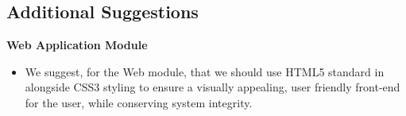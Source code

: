 \documentclass[12pt]{article}
\begin{document}
                   \subsection{Additional Suggestions}
                   \textbf{Web Application Module}
                   \begin{itemize}
                   \item We suggest, for the Web module, that we should use HTML5 standard in alongside CSS3 styling to ensure a visually appealing, user friendly front-end for the user, while conserving system integrity.
                   
                   
                   \end{itemize}
                                   
                    
        
\end{document}
